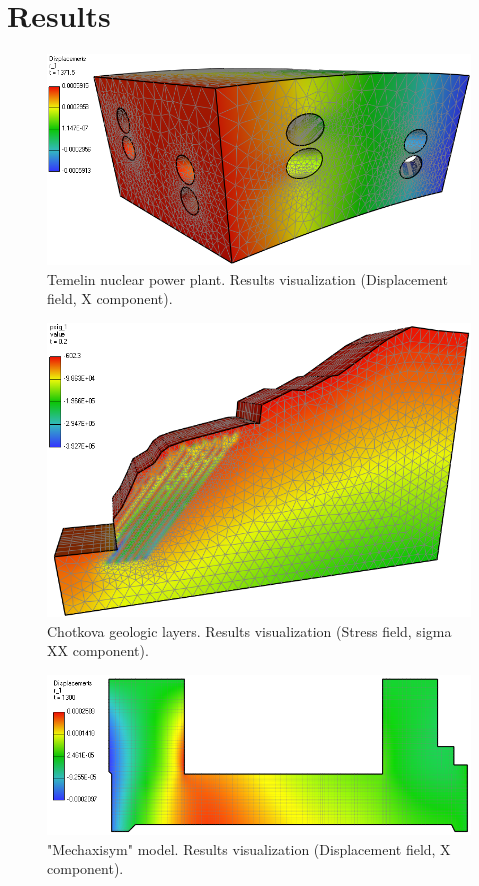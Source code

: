 \section{Results}
\label{sec:results}

\begin{figure}[ht]
\centering\includegraphics[width=\textwidth]{figures/temelin_screenshot}
\caption{Temelin nuclear power plant. Results visualization (Displacement field, X component).}
\label{fig:temelin:mesh}
\end{figure}

\begin{figure}[ht]
\centering\includegraphics[width=\textwidth]{figures/chotkova_screenshot}
\caption{Chotkova geologic layers. Results visualization (Stress field, sigma XX component).}
\label{fig:chotkova:mesh}
\end{figure}

\begin{figure}[ht]
\centering\includegraphics[width=\textwidth]{figures/mechaxisym_screenshot}
\caption{"Mechaxisym" model. Results visualization (Displacement field, X component).}
\label{fig:mechaxisym:mesh}
\end{figure}

